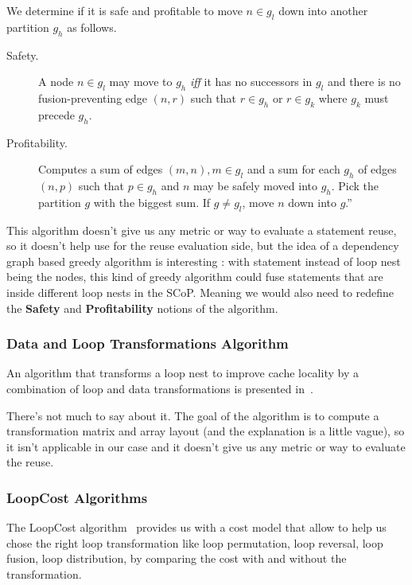 \documentclass[paper=a4, fontsize=11.5pt]{scrartcl}
\numberwithin{equation}{section}        %
\numberwithin{figure}{section}          %
\numberwithin{table}{section}               %
\begin{document}
                We determine if it is safe and profitable to move $n \in g_l$ down
                into another partition $g_h$ as follows.
                \begin{description}
                    \item [Safety.] A node $n \in g_l$ may move to $g_h$ \textit{iff} it
                        has no successors in $g_l$ and there is no fusion-preventing
                        edge $(n,r)$ such that $r \in g_h$ or $r \in g_k$ where
                        $g_k$ must precede $g_h$.
                    \item [Profitability.] Computes a sum of edges $(m,n), m \in g_l$
                        and a sum for each $g_h$ of edges $(n,p)$ such that $p \in g_h$
                        and $n$ may be safely moved into $g_h$. Pick the partition
                        $g$ with the biggest sum. If $g \neq g_l$, move $n$ down into $g$.''
                \end{description}
            \bigskip
            
            This algorithm doesn't give us any metric or way to evaluate a statement
            reuse, so it doesn't help use for the reuse evaluation side, but the idea
            of a dependency graph based greedy algorithm is interesting : with statement
            instead of loop nest being the nodes, this kind of greedy algorithm 
            could fuse statements that are inside different loop nests in the SCoP.
            Meaning we would also need to redefine the \textbf{Safety} and \textbf{Profitability}
            notions of the algorithm.

        \subsubsection{Data and Loop Transformations Algorithm}
            An algorithm that transforms a loop nest to improve cache locality
            by a combination of loop and data transformations is presented in~\cite{Kandemir99improvingcache}.

            There's not much to say about it. The goal of the algorithm is to
            compute a transformation matrix and array layout (and the explanation is a little
            vague), so it isn't applicable in our case and it doesn't give us any metric or way to evaluate the reuse.
        
        \subsubsection{LoopCost Algorithms}
            The LoopCost algorithm~\cite{McKinley:1996:IDL:233561.233564} provides
            us with a cost model that allow to help us chose the right loop transformation like
            loop permutation, loop reversal, loop fusion, loop distribution,
            by comparing the cost with and without the transformation.
            
\end{document}

